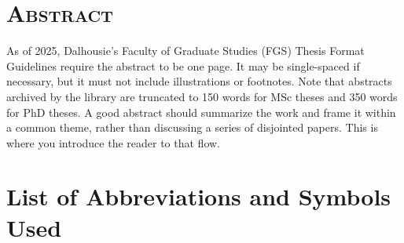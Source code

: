 \documentclass[12pt,letterpaper,oneside,titlepage,final]{dalthesis}
\numberwithin{equation}{section}
\begin{document}
\singlespacing              %
\tableofcontents
\clearpage
{}
{}
\listoftables
\clearpage
{}
{}
\listoffigures
\clearpage
\onehalfspacing             %







\chapter*{\centering\large\textsc{Abstract}}   

As of 2025, Dalhousie's Faculty of Graduate Studies (FGS) Thesis Format Guidelines require the abstract to be one page. It may be single-spaced if necessary, but it must not include illustrations or footnotes. Note that abstracts archived by the library are truncated to 150 words for MSc theses and 350 words for PhD theses. A good abstract should summarize the work and frame it within a common theme, rather than discussing a series of disjointed papers. This is where you introduce the reader to that flow.




\chapter*{List of Abbreviations and Symbols Used}
\end{document}
